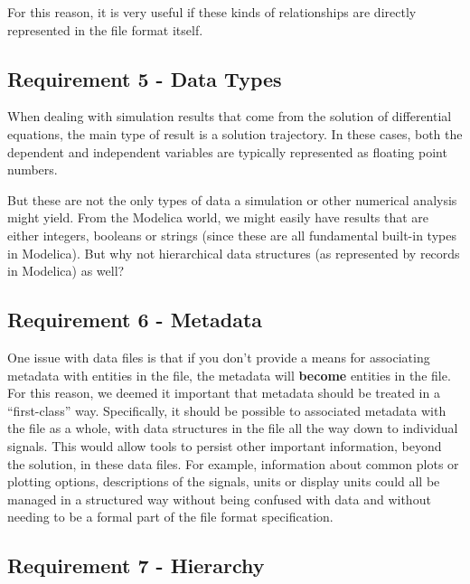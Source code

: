 \documentclass[11pt,a4paper,twocolumn]{article}
\begin{document}
For this reason, it is very useful if these kinds of relationships are
directly represented in the file format itself.

\subsection{Requirement 5 - Data Types}


When dealing with simulation results that come from the solution of
differential equations, the main type of result is a solution
trajectory.  In these cases, both the dependent and independent
variables are typically represented as floating point numbers.

But these are not the only types of data a simulation or other
numerical analysis might yield.  From the Modelica world, we might
easily have results that are either integers, booleans or strings
(since these are all fundamental built-in types in Modelica).  But why
not hierarchical data structures (as represented by records in
Modelica) as well?

\subsection{Requirement 6 - Metadata}


One issue with data files is that if you don't provide a means for
associating metadata with entities in the file, the metadata will
\textbf{become} entities in the file.  For this reason, we deemed it
important that metadata should be treated in a ``first-class'' way.
Specifically, it should be possible to associated metadata with the
file as a whole, with data structures in the file all the way down to
individual signals.  This would allow tools to persist other important
information, beyond the solution, in these data files.  For example,
information about common plots or plotting options, descriptions of
the signals, units or display units could all be managed in a
structured way without being confused with data and without needing to
be a formal part of the file format specification.

\subsection{Requirement 7 - Hierarchy}
\end{document}
